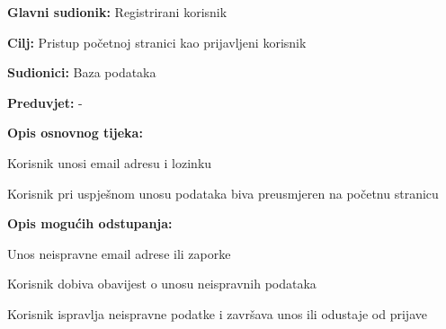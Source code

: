 					\noindent {}
					\begin{packed_item}
	
						\item \textbf{Glavni sudionik: }Registrirani korisnik
						\item  \textbf{Cilj:} Pristup početnoj stranici kao prijavljeni korisnik
						\item  \textbf{Sudionici:} Baza podataka
						\item  \textbf{Preduvjet:} -
						\item  \textbf{Opis osnovnog tijeka:}
						
						\item[] \begin{packed_enum}
							\item Korisnik unosi email adresu i lozinku
							\item Korisnik pri uspješnom unosu podataka biva preusmjeren na početnu stranicu
						\end{packed_enum}
						
						\item  \textbf{Opis mogućih odstupanja:}

						\item[] \begin{packed_item}
							\item[1.a] Unos neispravne email adrese ili zaporke
							\item[] \begin{packed_enum}
								
								\item Korisnik dobiva obavijest o unosu neispravnih podataka
								\item Korisnik ispravlja neispravne podatke i završava unos ili odustaje od prijave
								
							\end{packed_enum}					
						\end{packed_item}
					\end{packed_item}

					\eject

